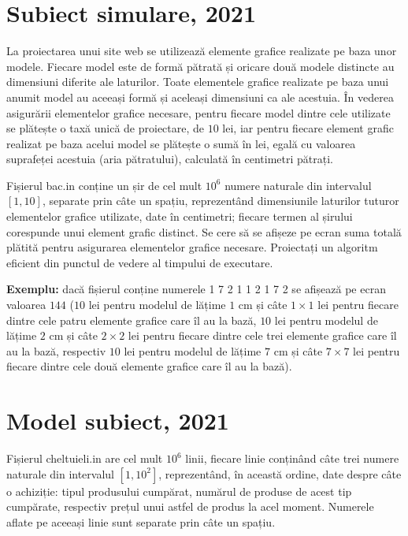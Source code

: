 \documentclass[10pt, a4paper]{article}
\newcommand{\highlight}[1]{{\ttfamily\color{red}#1}}
\begin{document}
\section{Subiect simulare, 2021}
La proiectarea unui site web se utilizează elemente grafice realizate pe baza unor modele. Fiecare model este de formă pătrată și oricare două modele distincte au dimensiuni diferite ale laturilor. Toate elementele grafice realizate pe baza unui anumit model au aceeași formă și aceleași dimensiuni ca ale acestuia. În vederea asigurării elementelor grafice necesare, pentru fiecare model dintre cele utilizate se plătește o taxă unică de proiectare, de \highlight{$10$} lei, iar pentru fiecare element grafic realizat pe baza acelui model se plătește o sumă în lei, egală cu valoarea suprafeței acestuia (aria pătratului), calculată în centimetri pătrați.

\vspace{0.2cm}
\noindent Fișierul \highlight{bac.in} conține un șir de cel mult \highlight{$10^6$} numere naturale din intervalul \highlight{$[1,10]$}, separate prin câte un spațiu, reprezentând dimensiunile laturilor tuturor elementelor grafice utilizate, date în centimetri; fiecare termen al șirului corespunde unui element grafic distinct. Se cere să se afișeze pe ecran suma totală plătită pentru asigurarea elementelor grafice necesare. Proiectați un algoritm eficient din punctul de vedere al timpului de executare.

\vspace{0.2cm}
\noindent \textbf{Exemplu:} dacă fișierul conține numerele \highlight{1 7 2 1 1 2 1 7 2} se afișează pe ecran valoarea \highlight{$144$} (\highlight{$10$} lei pentru modelul de lățime \highlight{$1$} cm și câte \highlight{$1\times1$} lei pentru fiecare dintre cele patru elemente grafice care îl au la bază, \highlight{$10$} lei pentru modelul de lățime \highlight{$2$} cm și câte \highlight{$2\times2$} lei pentru fiecare dintre cele trei elemente grafice care îl au la bază, respectiv \highlight{$10$} lei pentru modelul de lățime \highlight{$7$} cm și câte \highlight{$7\times7$} lei pentru fiecare dintre cele două elemente grafice care îl au la bază).

\newpage
\section{Model subiect, 2021}
Fișierul \highlight{cheltuieli.in} are cel mult \highlight{$10^6$} linii, fiecare linie conținând câte trei numere naturale din intervalul \highlight{$[1,10^2]$}, reprezentând, în această ordine, date despre câte o achiziție: tipul produsului cumpărat, numărul de produse de acest tip cumpărate, respectiv prețul unui astfel de produs la acel moment. Numerele aflate pe aceeași linie sunt separate prin câte un spațiu.
\end{document}
